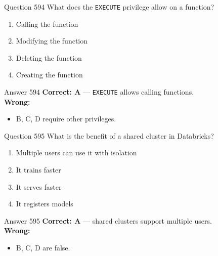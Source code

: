 \documentclass[aspectratio=169,11pt]{beamer}
\begin{document}
	\begin{frame}{Question 594}
		What does the \texttt{EXECUTE} privilege allow on a function?
		\begin{enumerate}[label=\Alph*.]
			\item Calling the function
			\item Modifying the function
			\item Deleting the function
			\item Creating the function
		\end{enumerate}
	\end{frame}
	\begin{frame}{Answer 594}
		\textbf{Correct: A} --- \texttt{EXECUTE} allows calling functions.\\
		\vspace{0.5em}
		\textbf{Wrong:}
		\begin{itemize}
			\item B, C, D require other privileges.
		\end{itemize}
	\end{frame}
	
	\begin{frame}{Question 595}
		What is the benefit of a shared cluster in Databricks?
		\begin{enumerate}[label=\Alph*.]
			\item Multiple users can use it with isolation
			\item It trains faster
			\item It serves faster
			\item It registers models
		\end{enumerate}
	\end{frame}
	\begin{frame}{Answer 595}
		\textbf{Correct: A} --- shared clusters support multiple users.\\
		\vspace{0.5em}
		\textbf{Wrong:}
		\begin{itemize}
			\item B, C, D are false.
		\end{itemize}
	\end{frame}
	
\end{document}
